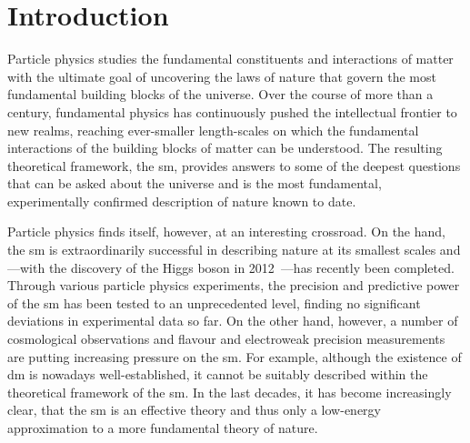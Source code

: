 
\chapter*{Introduction}
\ifpdf
    \graphicspath{{Chapter1/Figs/Raster/}{Chapter1/Figs/PDF/}{Chapter1/Figs/}}
\else
    \graphicspath{{Chapter1/Figs/Vector/}{Chapter1/Figs/}}
\fi

Particle physics studies the fundamental constituents and interactions of matter with the ultimate goal of uncovering the laws of nature that govern the most fundamental building blocks of the universe. Over the course of more than a century, fundamental physics has continuously pushed the intellectual frontier to new realms, reaching ever-smaller length-scales on which the fundamental interactions of the building blocks of matter can be understood. The resulting theoretical framework, the \gls{sm}, provides answers to some of the deepest questions that can be asked about the universe and is the most fundamental, experimentally confirmed description of nature known to date. 

Particle physics finds itself, however, at an interesting crossroad. On the hand, the \gls{sm} is extraordinarily successful in describing nature at its smallest scales and---with the discovery of the Higgs boson in 2012~\cite{HIGG-2012-27,CMS-HIG-12-028}---has recently been completed. Through various particle physics experiments, the precision and predictive power of the \gls{sm} has been tested to an unprecedented level, finding no significant deviations in experimental data so far. On the other hand, however, a number of cosmological observations and flavour and electroweak precision measurements are putting increasing pressure on the \gls{sm}. For example, although the existence of \gls{dm} is nowadays well-established, it cannot be suitably described within the theoretical framework of the \gls{sm}. In the last decades, it has become increasingly clear, that the \gls{sm} is an effective theory and thus only a low-energy approximation to a more fundamental theory of nature.

